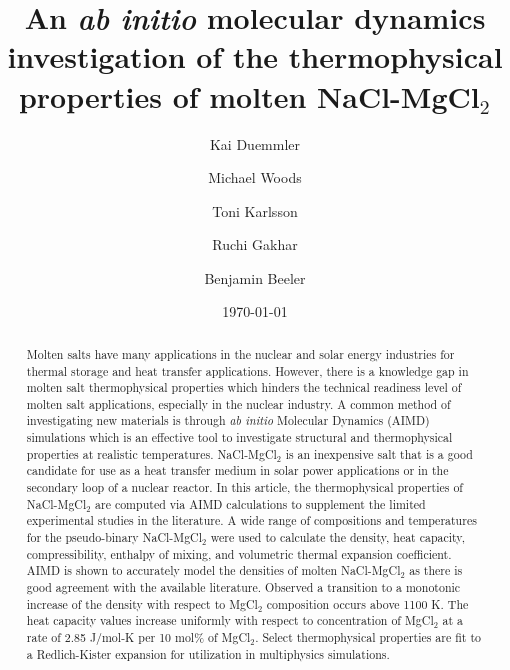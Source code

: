 \documentclass[review]{elsarticle}
\begin{document}
\begin{frontmatter}

\title{An \textit{ab initio} molecular dynamics investigation of the thermophysical properties of molten NaCl-MgCl$_2$ }

\author[ncsu]{Kai Duemmler}
\author[inl]{Michael Woods}
\author[inl]{Toni Karlsson}
\author[inl]{Ruchi Gakhar}
\author[ncsu,inl]{Benjamin Beeler}

\address[ncsu]{North Carolina State University, Raleigh, NC 27695}
\address[inl]{Idaho National Laboratory, Idaho Falls, ID 83415}
\date{\today}

\begin{abstract}
Molten salts have many applications in the nuclear and solar energy industries for thermal storage and heat transfer applications. However, there is a knowledge gap in molten salt thermophysical properties which hinders the technical readiness level of molten salt applications, especially in the nuclear industry. A common method of investigating new materials is through \textit{ab initio} Molecular Dynamics (AIMD) simulations which is an effective tool to investigate structural and thermophysical properties at realistic temperatures. NaCl-MgCl$_2$ is an inexpensive salt that is a good candidate for use as a heat transfer medium in solar power applications or in the secondary loop of a nuclear reactor. In this article, the thermophysical properties of NaCl-MgCl$_2$ are computed via AIMD calculations to supplement the limited experimental studies in the literature. A wide range of compositions and temperatures for the pseudo-binary NaCl-MgCl$_2$ were used to calculate the density, heat capacity, compressibility, enthalpy of mixing, and volumetric thermal expansion coefficient. AIMD is shown to accurately model the densities of molten NaCl-MgCl$_2$ as there is good agreement with the available literature. Observed a transition to a monotonic increase of the density with respect to MgCl$_2$ composition occurs above 1100 K. The heat capacity values increase uniformly with respect to concentration of MgCl$_2$ at a rate of 2.85 J/mol-K per 10 mol\% of MgCl$_2$. Select thermophysical properties are fit to a Redlich-Kister expansion for utilization in multiphysics simulations. 
\end{abstract}

\end{frontmatter}
\end{document}
